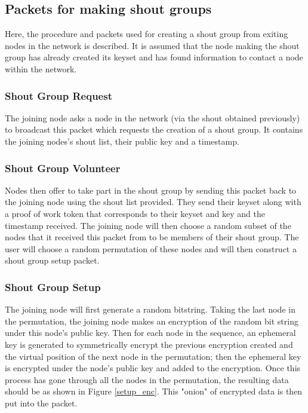 \documentclass[ %
                    author={Luke Murray},
                supervisor={Dr. Simon Hollis},
                     title={Shadow Peer-to-Peer Networks},
                  subtitle={},
                    degree={MEng},
                      year={2013} ]{thesis}
\begin{document}
\subsection{Packets for making shout groups}
\label{sec:create_shout_group}

Here, the procedure and packets used for creating a shout group from exiting nodes in the network is described. It is assumed that the node making the shout group has already created its keyset and has found information to contact a node within the network.

\subsubsection{Shout Group Request}

The joining node asks a node in the network (via the shout obtained previously) to broadcast this packet which requests the creation of a shout group. It contains the joining nodes's shout list, their public key and a timestamp.

\subsubsection{Shout Group Volunteer}

Nodes then offer to take part in the shout group by sending this packet back to the joining node using the shout list provided. They send their keyset along with a proof of work token that corresponds to their keyset and key and the timestamp received. The joining node will then choose a random subset of the nodes that it received this packet from to be members of their shout group. The user will choose a random permutation of these nodes and will then construct a shout group setup packet.

\subsubsection{Shout Group Setup}

The joining node will first generate a random bitstring. Taking the last node in the permutation, the joining node makes an encryption of the random bit string under this node's public key. Then for each node in the sequence, an ephemeral key is generated to symmetrically encrypt the previous encryption created and the virtual position of the next node in the permutation; then the ephemeral key is encrypted under the node's public key and added to the encryption. Once this process has gone through all the nodes in the permutation, the resulting data should be as shown in Figure \ref{setup_enc}. This "onion" of encrypted data is then put into the packet.
\end{document}
